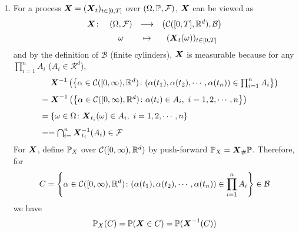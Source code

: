 \documentclass[a4paper,12pt]{article}
\begin{document}
\begin{itemize}
  \begin{enumerate}[label=(\arabic*)]
    \item For a process $\boldsymbol{X} = (\boldsymbol{X}_t)_{t \in [0,T]}$ over $(\Omega, \mathbb{P}, \mathcal{F})$, $\boldsymbol{X}$ can be viewed as
    \begin{equation*}
      \begin{array}{cccc}
      \vspace{0.5em}
        \bd{X} \colon &(\Omega,\mathcal{F})& \longrightarrow &\bc{\mathcal{C}([0,T],\R^d),\mathcal{B}} \\
        ~&\omega &\mapsto & (\bd{X}_t(\omega))_{t \in [0,T]}
      \end{array}
    \end{equation*}
    and by the definition of $\mathcal{B}$ (finite cylinders), $\boldsymbol{X}$ is measurable because for any $\prod_{i=1}^nA_i$ ($A_i \in \mathcal{R}^d$),
    \begin{equation*}
      \begin{array}{ll}
        \vspace{0.8em}
        ~&\quad \bd{X}^{-1}\bc{\bb{\alpha \in \mathcal{C}([0,\infty), \R^d) \colon (\alpha(t_1),\alpha(t_2),\cdots,\alpha(t_n)) \in \prod_{i=1}^nA_i}}\\\vspace{0.8em}
        ~&= \bd{X}^{-1}\bc{\bb{\alpha \in \mathcal{C}([0,\infty), \R^d) \colon \alpha(t_i) \in A_i,~i=1,2,\cdots,n}} \\\vspace{0.8em}
        ~&= \bb{\omega \in \Omega \colon \bd{X}_{t_i}(\omega) \in A_i,~i=1,2,\cdots,n} \\
        ~&== \bigcap_{i=}^n\bd{X}^{-1}_{t_i}(A_i) \in \mathcal{F}
      \end{array}
    \end{equation*}
    For $\boldsymbol{X}$, define $\mathbb{P}_X$ over $\mathcal{C}([0,\infty), \mathbb{R}^d)$ by push-forward $\mathbb{P}_X = \boldsymbol{X}_{\#}\mathbb{P} $. Therefore, for
    \begin{equation*}
      C = \left\{\alpha \in \mathcal{C}([0,\infty), \mathbb{R}^d) \colon (\alpha(t_1),\alpha(t_2),\cdots,\alpha(t_n)) \in \prod_{i=1}^nA_i \right\} \in \mathcal{B}
    \end{equation*}
    we have
    \begin{equation*}
      \mathbb{P}_X(C) = \mathbb{P}(\boldsymbol{X} \in  C) = \mathbb{P}(\boldsymbol{X}^{-1}(C))
    \end{equation*}


\end{enumerate}
\end{itemize}
\end{document}
